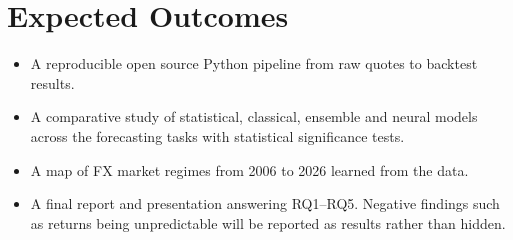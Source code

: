 \documentclass[11pt,a4paper]{article}
\begin{document}
\section*{Expected Outcomes}
\begin{itemize}
  \item A reproducible open source Python pipeline from raw quotes to backtest results.
  \item A comparative study of statistical, classical, ensemble and neural models across the forecasting tasks with statistical significance tests.
  \item A map of FX market regimes from 2006 to 2026 learned from the data.
  \item A final report and presentation answering RQ1--RQ5. Negative findings such as returns being unpredictable will be reported as results rather than hidden.
\end{itemize}
\end{document}

